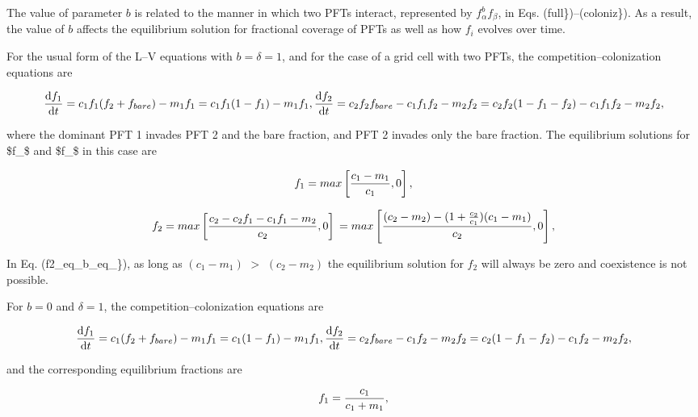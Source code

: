The value of parameter $b$ is related to the manner in which two P\+F\+Ts interact, represented by $f_{\alpha}^b f_{\beta}$, in Eqs. (full\})--(coloniz\}). As a result, the value of $b$ affects the equilibrium solution for fractional coverage of P\+F\+Ts as well as how $f_i$ evolves over time.

For the usual form of the L--V equations with $b=\delta=1$, and for the case of a grid cell with two P\+F\+Ts, the competition--colonization equations are

\[ \frac{\mathrm{d}f_{1}} {\mathrm{d}t} = c_1 f_1 ( f_2 + f_{bare}) - m_1 f_1 \nonumber \\ = c_1 f_1 ( 1 - f_1) - m_1 f_1, \\ \frac{\mathrm{d}f_{2}} {\mathrm{d}t} = c_2 f_2 f_{bare} - c_1 f_1 f_2 - m_2 f_2 \nonumber \\ = c_2 f_2 (1 - f_1 - f_2) - c_1 f_1 f_2 - m_2 f_2\label{cc_eq_b_eq_1_2}, \]

where the dominant P\+F\+T 1 invades P\+F\+T 2 and the bare fraction, and P\+F\+T 2 invades only the bare fraction. The equilibrium solutions for \$f\+\_\$ and \$f\+\_\$ in this case are

\[ f_1=max \left[ \frac{c_1 - m_1}{c_1}, 0 \right], \vspace*{-4mm} \]

\[ f_2 = max \left[ \frac{c_2 - c_2 f_1 - c_1 f_1 - m_2}{c_2}, 0 \right] \nonumber \\ = max \left[ \frac{(c_2 - m_2)-(1+\frac{c_2}{c_1})(c_1-m_1)}{c_2},0 \right],\label{f2_eq_b_eq_1} \]

In Eq. (f2\+\_\+eq\+\_\+b\+\_\+eq\+\_\}), as long as $(c_1 - m_1)$ $>$ $(c_2 - m_2)$ the equilibrium solution for $f_2$ will always be zero and coexistence is not possible.

For $b=0$ and $\delta=1$, the competition--colonization equations are

\[ \frac{\mathrm{d}f_{1}} {\mathrm{d}t} = c_1 ( f_2 + f_{bare}) - m_1 f_1 \nonumber \\ = c_1 ( 1 - f_1) - m_1 f_1, \\ \frac{\mathrm{d}f_{2}} {\mathrm{d}t} = c_2 f_{bare} - c_1 f_2 - m_2 f_2 \nonumber \\ = c_2 (1 - f_1 - f_2) - c_1 f_2 - m_2 f_2,\label{cc_eq_b_eq_0_1} \]

and the corresponding equilibrium fractions are

\[ \label{f_equil_b_eq_0_1} f_1 = \frac{c_1}{c_1 + m_1}, \vspace*{-4mm} \]

